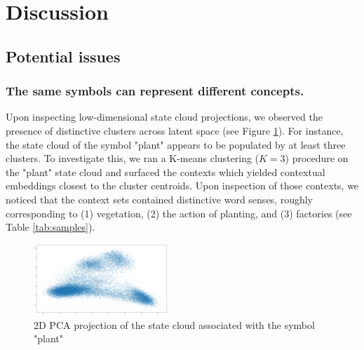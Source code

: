 \section{Discussion}\label{sec:discussion}

\subsection{Potential issues}

\subsubsection{The same symbols can represent different concepts.}

Upon inspecting low-dimensional state cloud projections, we observed the presence of distinctive clusters across latent space (see Figure \ref{fig:plant}). For instance, the state cloud of the symbol "plant" appears to be populated by at least three clusters. To investigate this, we ran a K-means clustering ($K=3$) procedure on the "plant" state cloud and surfaced the contexts which yielded contextual embeddings closest to the cluster centroids. Upon inspection of those contexts, we noticed that the context sets contained distinctive word senses, roughly corresponding to (1) vegetation, (2) the action of planting, and (3) factories (see Table \ref{tab:samples}).

\begin{figure}[h]
    \centering
    \includegraphics[width=0.45\textwidth]{img/plant.png}
    \caption{2D PCA projection of the state cloud associated with the symbol "plant"}\label{fig:plant}
\end{figure}

